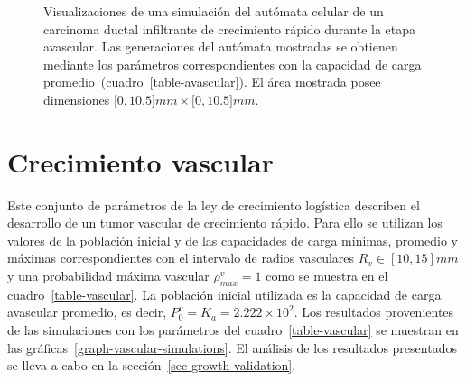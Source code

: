 \begin{figure}[!ht]
\begin{center}
\end{center}\vspace*{-0.6cm}
\caption[Visualizaciones de una simulaci\'on del aut\'omata celular de un carcinoma ductal infiltrante de crecimiento r\'apido durante la etapa avascular]{Visualizaciones de una simulaci\'on del aut\'omata celular de un carcinoma ductal infiltrante de crecimiento r\'apido durante la etapa avascular. Las generaciones del aut\'omata mostradas se obtienen mediante los par\'ametros correspondientes con la capacidad de carga promedio~(cuadro~\ref{table-avascular}). El \'area mostrada posee dimensiones $[0,10$.$5]mm \times [0,10$.$5]mm$.}
\label{fig-avascular-automata}
\end{figure}

\section{Crecimiento vascular}
\label{sec-vascular-results}
Este conjunto de par\'ametros de la ley de crecimiento log\'istica describen el desarrollo de un tumor vascular de crecimiento r\'apido. Para ello se utilizan los valores de la poblaci\'on inicial y de las capacidades de carga m\'inimas, promedio y m\'aximas correspondientes con el intervalo de radios vasculares $R_v \in [10, 15]mm$ y una probabilidad m\'axima vascular $\rho_{max}^v=1$ como se muestra en el cuadro~\ref{table-vascular}. La poblaci\'on inicial utilizada es la capacidad de carga avascular promedio, es decir, $P_0^v = K_a = 2$.$222 \times 10^2$. Los resultados provenientes de las simulaciones con los par\'ametros del cuadro~\ref{table-vascular} se muestran en las gr\'aficas~\ref{graph-vascular-simulations}. El an\'alisis de los resultados presentados se lleva a cabo en la secci\'on~\ref{sec-growth-validation}.
\begin{table}[!ht]
\begin{center}
\vspace*{-0.6cm}
\end{center}
\caption[Par\'ametros del desarrollo de un carcinoma ductal infiltrante de crecimiento r\'apido durante la etapa vascular]{Par\'ametros del desarrollo de un carcinoma ductal infiltrante de crecimiento r\'apido durante la etapa vascular.}
\label{table-vascular}
\end{table}

